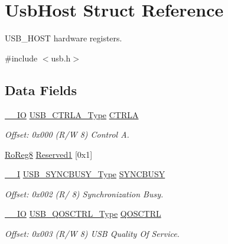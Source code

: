 \hypertarget{struct_usb_host}{}\section{Usb\+Host Struct Reference}
\label{struct_usb_host}


U\+S\+B\+\_\+\+H\+O\+ST hardware registers.  




{\ttfamily \#include $<$usb.\+h$>$}

\subsection*{Data Fields}
\begin{DoxyCompactItemize}
\item 
\mbox{\hyperlink{core__cm0plus_8h_aec43007d9998a0a0e01faede4133d6be}{\+\_\+\+\_\+\+IO}} \mbox{\hyperlink{union_u_s_b___c_t_r_l_a___type}{U\+S\+B\+\_\+\+C\+T\+R\+L\+A\+\_\+\+Type}} \mbox{\hyperlink{struct_usb_host_aa15f86099ea2915cc8667b8ba3980a91}{C\+T\+R\+LA}}
\begin{DoxyCompactList}\small\item\em Offset\+: 0x000 (R/W 8) Control A. \end{DoxyCompactList}\item 
\mbox{\hyperlink{group___s_a_m_d21_e15_a__definitions_ga0d957f1433aaf5d70e4dc2b68288442d}{Ro\+Reg8}} \mbox{\hyperlink{struct_usb_host_a092866123ac46d0985136e4dca2f36f4}{Reserved1}} \mbox{[}0x1\mbox{]}
\item 
\mbox{\hyperlink{core__cm0plus_8h_af63697ed9952cc71e1225efe205f6cd3}{\+\_\+\+\_\+I}} \mbox{\hyperlink{union_u_s_b___s_y_n_c_b_u_s_y___type}{U\+S\+B\+\_\+\+S\+Y\+N\+C\+B\+U\+S\+Y\+\_\+\+Type}} \mbox{\hyperlink{struct_usb_host_a207c0e2e615d2c9a63a3cd1f81d252f7}{S\+Y\+N\+C\+B\+U\+SY}}
\begin{DoxyCompactList}\small\item\em Offset\+: 0x002 (R/ 8) Synchronization Busy. \end{DoxyCompactList}\item 
\mbox{\hyperlink{core__cm0plus_8h_aec43007d9998a0a0e01faede4133d6be}{\+\_\+\+\_\+\+IO}} \mbox{\hyperlink{union_u_s_b___q_o_s_c_t_r_l___type}{U\+S\+B\+\_\+\+Q\+O\+S\+C\+T\+R\+L\+\_\+\+Type}} \mbox{\hyperlink{struct_usb_host_a9df8751b364843c227b690917f10a4b4}{Q\+O\+S\+C\+T\+RL}}
\begin{DoxyCompactList}\small\item\em Offset\+: 0x003 (R/W 8) U\+SB Quality Of Service. \end{DoxyCompactList}\item 

\end{DoxyCompactItemize}
